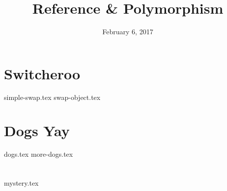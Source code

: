 \documentclass{exam}
\title{Reference \& Polymorphism}
\date{February 6, 2017}
\begin{document}
\maketitle
\notes

\section{Switcheroo}
\begin{questions}
{simple-swap.tex}
{swap-object.tex}
\end{questions}

\clearpage

\section{Dogs Yay}
\begin{questions}
{dogs.tex}
\clearpage
{more-dogs.tex}
\end{questions}

\clearpage

\section{}
\begin{questions}
{mystery.tex}
\end{questions}
\end{document}
